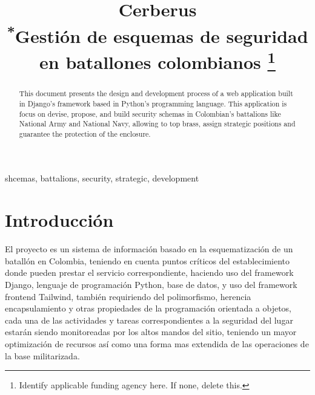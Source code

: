 \documentclass[conference]{IEEEtran}
\begin{document}
\title{Cerberus\\
{\footnotesize \textsuperscript{*}Gestión de esquemas de seguridad en batallones colombianos}
\thanks{Identify applicable funding agency here. If none, delete this.}
}

\author{
\and
{}
}

\maketitle

\begin{abstract}
This document presents the design and development process of a web application built in Django's framework based in Python's programming language. This application is focus on devise, propose, and build security schemas in Colombian's battalions like National Army and National Navy, allowing to top brass, assign strategic positions and guarantee the protection of the enclosure.
\end{abstract}

\begin{IEEEkeywords}
shcemas, battalions, security, strategic, development
\end{IEEEkeywords}

\section{Introducción}
El proyecto es un sistema de información basado en la esquematización de un batallón en Colombia, teniendo en cuenta puntos críticos del establecimiento donde pueden prestar el servicio correspondiente, haciendo uso del framework Django, lenguaje de programación Python, base de datos, y uso del framework frontend Tailwind, también requiriendo del polimorfismo, herencia encapsulamiento y otras propiedades de la programación orientada a objetos, cada una de las actividades y tareas correspondientes a la seguridad del lugar estarán siendo monitoreadas por los altos mandos del sitio, teniendo un mayor optimización de recursos así como una forma mas extendida de las operaciones de la base militarizada.
\end{document}
